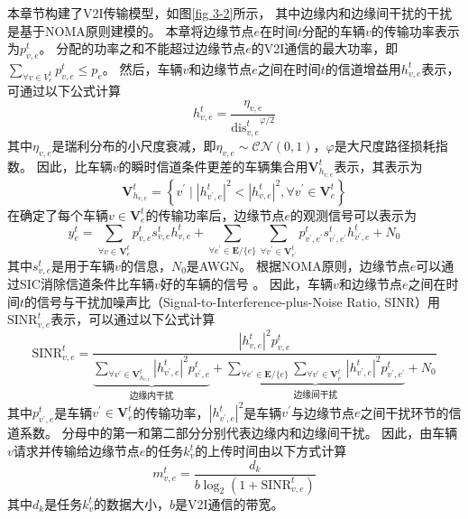 本章节构建了V2I传输模型，如图\ref{fig 3-2}所示， 其中边缘内和边缘间干扰的干扰是基于NOMA原则建模的。
本章将边缘节点$e$在时间$t$分配的车辆$v$的传输功率表示为$p_{v, e}^{t}$。
分配的功率之和不能超过边缘节点$e$的V2I通信的最大功率，即$\sum_{\forall v \in {V}_{e}^{t}} p_{v, e}^{t} \leq p_{e}$。
然后，车辆$v$和边缘节点$e$之间在时间$t$的信道增益用$h_{v, e}^t$表示，可通过以下公式计算\cite{sun2020performance}
\begin{equation}
	h_{v, e}^t = \frac{\eta_{v, e}}{{\operatorname{dis}_{v, e}^{t}}^{\varphi/2}}
\end{equation}
\noindent 其中$\eta_{v, e}$是瑞利分布的小尺度衰减，即$\eta_{v, e} \sim \mathcal{CN}(0, 1)$，$\varphi$是大尺度路径损耗指数。
因此，比车辆$v$的瞬时信道条件更差的车辆集合用$\mathbf{V}_{h_{v, e}}^{t}$表示，其表示为
\begin{equation}
	\mathbf{V}_{h_{v, e}}^{t} = \left \{ v^{\prime} \mid  \left|h_{v^{\prime}, e}^t \right|^{2} < \left| h_{v, e}^t\right |^{2} , \forall v^{\prime} \in \mathbf{V}_{e}^{t} \right \}
\end{equation}
在确定了每个车辆$v \in \mathbf{V}_{e}^{t}$的传输功率后，边缘节点$e$的观测信号可以表示为\cite{islam2017power}
\begin{equation}
	y_e^{t} = \sum_{\forall v \in \mathbf{V}_{e}^{t}} p_{v, e}^{t} s_{v, e}^{t} h_{v, e}^t + \sum\limits_{\forall e^{\prime} \in \mathbf{E} / \{e\}} \sum\limits_{\forall v^{\prime} \in \mathbf{V}_{e^{\prime}}^{t}} p_{v^{\prime}, e^{\prime}}^{t} s_{v^{\prime}, e^{\prime}}^{t} h_{v^{\prime}, e}^t + N_{0}
\end{equation}
其中$s_{v, e}^{t}$是用于车辆$v$的信息，$N_{0}$是AWGN。
根据NOMA原则，边缘节点$e$可以通过SIC消除信道条件比车辆$v$好的车辆的信号 \cite{du2021ji}。
因此，车辆$v$和边缘节点$e$之间在时间$t$的信号与干扰加噪声比（Signal-to-Interference-plus-Noise Ratio, SINR）用$\mathrm{SINR}_{v, e}^t$表示，可以通过以下公式计算
\begin{equation}
	\mathrm{SINR}_{v, e}^t = \frac{ |h_{v, e}^t| ^{2}  p_{v, e}^{t}}{ \underbrace{\sum\limits_{\forall v^{\prime} \in \mathbf{V}_{h_{v, e}}^{t}} |h_{v^{\prime}, e}^t|^2 p_{v^{\prime}, e}^{t}}_{\text {边缘内干扰}} + \underbrace{\sum\limits_{\forall e^{\prime} \in \mathbf{E} / \{e\}} \sum\limits_{\forall v^{\prime} \in \mathbf{V}_{e^{\prime}}^{t}} |h_{v^{\prime}, e}^t|^2 p_{v^{\prime}, e^{\prime}}^{t}}_{\text {边缘间干扰}} + N_{0}}
\end{equation}
其中$p_{v^{\prime}, e}^{t}$是车辆$v^{\prime} \in \mathbf{V}_{e}^{t}$的传输功率，$|h_{v^{\prime}, e}^t|^2$是车辆$v^{\prime}$与边缘节点$e$之间干扰环节的信道系数。
分母中的第一和第二部分分别代表边缘内和边缘间干扰。
因此，由车辆$v$请求并传输给边缘节点$e$的任务$k_{v}^{t}$的上传时间由以下方式计算
\begin{equation}
	m_{v, e}^{t} = \frac{d_{k}}{b  \log _{2}\left(1+\mathrm{SINR}_{v, e}^t\right)}
\end{equation}
其中$d_k$是任务$k_{v}^{t}$的数据大小，$b$是V2I通信的带宽。


